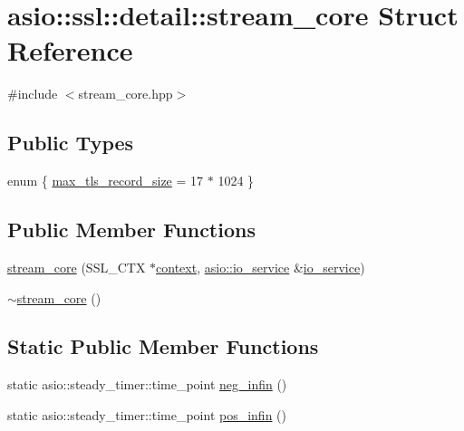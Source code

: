 \hypertarget{structasio_1_1ssl_1_1detail_1_1stream__core}{}\section{asio\+:\+:ssl\+:\+:detail\+:\+:stream\+\_\+core Struct Reference}
\label{structasio_1_1ssl_1_1detail_1_1stream__core}


{\ttfamily \#include $<$stream\+\_\+core.\+hpp$>$}

\subsection*{Public Types}
\begin{DoxyCompactItemize}
\item 
enum \{ \hyperlink{structasio_1_1ssl_1_1detail_1_1stream__core_a6d8fab43d93cf074312d25632039f062a497fe57d44a45883cccfbb7658dbfe21}{max\+\_\+tls\+\_\+record\+\_\+size} = 17 $\ast$ 1024
 \}
\end{DoxyCompactItemize}
\subsection*{Public Member Functions}
\begin{DoxyCompactItemize}
\item 
\hyperlink{structasio_1_1ssl_1_1detail_1_1stream__core_aa1c18ebb8efc1c67e7e58d15759c2b4d}{stream\+\_\+core} (S\+S\+L\+\_\+\+C\+T\+X $\ast$\hyperlink{classasio_1_1ssl_1_1context}{context}, \hyperlink{classasio_1_1io__service}{asio\+::io\+\_\+service} \&\hyperlink{classasio_1_1io__service}{io\+\_\+service})
\item 
\hyperlink{structasio_1_1ssl_1_1detail_1_1stream__core_a1011966a166bca47bc731a0d268a673b}{$\sim$stream\+\_\+core} ()
\end{DoxyCompactItemize}
\subsection*{Static Public Member Functions}
\begin{DoxyCompactItemize}
\item 
static asio\+::steady\+\_\+timer\+::time\+\_\+point \hyperlink{structasio_1_1ssl_1_1detail_1_1stream__core_acb4384d907a6e47792357a82c9551c35}{neg\+\_\+infin} ()
\item 
static asio\+::steady\+\_\+timer\+::time\+\_\+point \hyperlink{structasio_1_1ssl_1_1detail_1_1stream__core_afdb154460ebaaff0dfdf7fd1c43e680a}{pos\+\_\+infin} ()
\end{DoxyCompactItemize}
